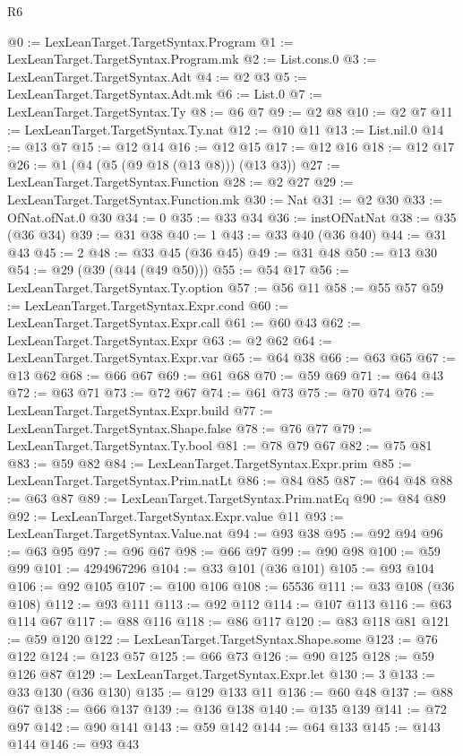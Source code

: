 \begin{lexlean}{R6}
\begin{coremodule}
@0 := LexLeanTarget.TargetSyntax.Program
@1 := LexLeanTarget.TargetSyntax.Program.mk
@2 := List.cons.{0}
@3 := LexLeanTarget.TargetSyntax.Adt
@4 := @2 @3
@5 := LexLeanTarget.TargetSyntax.Adt.mk
@6 := List.{0}
@7 := LexLeanTarget.TargetSyntax.Ty
@8 := @6 @7
@9 := @2 @8
@10 := @2 @7
@11 := LexLeanTarget.TargetSyntax.Ty.nat
@12 := @10 @11
@13 := List.nil.{0}
@14 := @13 @7
@15 := @12 @14
@16 := @12 @15
@17 := @12 @16
@18 := @12 @17
@26 := @1 (@4 (@5 (@9 @18 (@13 @8))) (@13 @3))
@27 := LexLeanTarget.TargetSyntax.Function
@28 := @2 @27
@29 := LexLeanTarget.TargetSyntax.Function.mk
@30 := Nat
@31 := @2 @30
@33 := OfNat.ofNat.{0} @30
@34 := 0
@35 := @33 @34
@36 := instOfNatNat
@38 := @35 (@36 @34)
@39 := @31 @38
@40 := 1
@43 := @33 @40 (@36 @40)
@44 := @31 @43
@45 := 2
@48 := @33 @45 (@36 @45)
@49 := @31 @48
@50 := @13 @30
@54 := @29 (@39 (@44 (@49 @50)))
@55 := @54 @17
@56 := LexLeanTarget.TargetSyntax.Ty.option
@57 := @56 @11
@58 := @55 @57
@59 := LexLeanTarget.TargetSyntax.Expr.cond
@60 := LexLeanTarget.TargetSyntax.Expr.call
@61 := @60 @43
@62 := LexLeanTarget.TargetSyntax.Expr
@63 := @2 @62
@64 := LexLeanTarget.TargetSyntax.Expr.var
@65 := @64 @38
@66 := @63 @65
@67 := @13 @62
@68 := @66 @67
@69 := @61 @68
@70 := @59 @69
@71 := @64 @43
@72 := @63 @71
@73 := @72 @67
@74 := @61 @73
@75 := @70 @74
@76 := LexLeanTarget.TargetSyntax.Expr.build
@77 := LexLeanTarget.TargetSyntax.Shape.false
@78 := @76 @77
@79 := LexLeanTarget.TargetSyntax.Ty.bool
@81 := @78 @79 @67
@82 := @75 @81
@83 := @59 @82
@84 := LexLeanTarget.TargetSyntax.Expr.prim
@85 := LexLeanTarget.TargetSyntax.Prim.natLt
@86 := @84 @85
@87 := @64 @48
@88 := @63 @87
@89 := LexLeanTarget.TargetSyntax.Prim.natEq
@90 := @84 @89
@92 := LexLeanTarget.TargetSyntax.Expr.value @11
@93 := LexLeanTarget.TargetSyntax.Value.nat
@94 := @93 @38
@95 := @92 @94
@96 := @63 @95
@97 := @96 @67
@98 := @66 @97
@99 := @90 @98
@100 := @59 @99
@101 := 4294967296
@104 := @33 @101 (@36 @101)
@105 := @93 @104
@106 := @92 @105
@107 := @100 @106
@108 := 65536
@111 := @33 @108 (@36 @108)
@112 := @93 @111
@113 := @92 @112
@114 := @107 @113
@116 := @63 @114 @67
@117 := @88 @116
@118 := @86 @117
@120 := @83 @118 @81
@121 := @59 @120
@122 := LexLeanTarget.TargetSyntax.Shape.some
@123 := @76 @122
@124 := @123 @57
@125 := @66 @73
@126 := @90 @125
@128 := @59 @126 @87
@129 := LexLeanTarget.TargetSyntax.Expr.let
@130 := 3
@133 := @33 @130 (@36 @130)
@135 := @129 @133 @11
@136 := @60 @48
@137 := @88 @67
@138 := @66 @137
@139 := @136 @138
@140 := @135 @139
@141 := @72 @97
@142 := @90 @141
@143 := @59 @142
@144 := @64 @133
@145 := @143 @144
@146 := @93 @43

\end{coremodule}
\end{lexlean}
